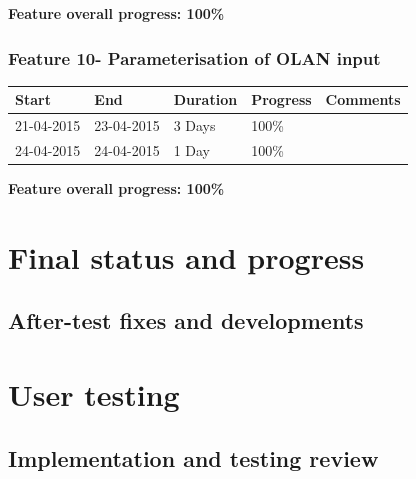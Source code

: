 \textbf{Feature overall progress: 100\%}

\subsubsection{Feature 10- Parameterisation of OLAN input}

\begin{table}[h]
\begin{tabular}{|l|l|l|l|p{7cm}|}
\hline
\textbf{Start} & \textbf{End} & \textbf{Duration} & \textbf{Progress} & \textbf{Comments}                                                                                                     \\ \hline
21-04-2015     & 23-04-2015   & 3 Days            & 100\%             &  \\ \hline
24-04-2015     & 24-04-2015   & 1 Day            & 100\%             &  \\ \hline
\end{tabular}
\end{table}

\textbf{Feature overall progress: 100\%}

\section{Final status and progress}
\subsection{After-test fixes and developments}
\section{User testing}

\subsection{Implementation and testing review}

